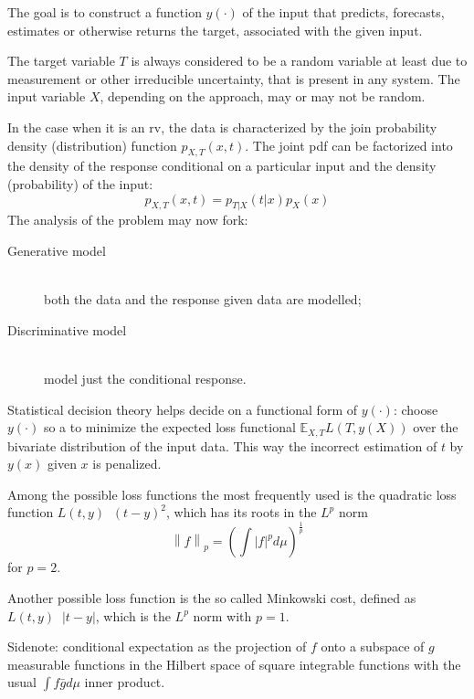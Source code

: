 \documentclass[a4paper]{article}
\newcommand{\brac}[1]{{\left ( #1 \right )}}
\newcommand{\induc}[1]{{\left . #1 \right \vert}}
\newcommand{\abs}[1]{{\left | #1 \right |}}
\newcommand{\nrm}[1]{{\left\| #1 \right \|}}
\newcommand{\Ex}[0]{{\mathbb{E}}}
\newcommand{\defn}{\mathop{\overset{\Delta}{=}}\nolimits}
\begin{document}
The goal is to construct a function $y(\cdot)$ of the input that predicts, forecasts, estimates or otherwise returns the target, associated with the given input.

The target variable $T$ is always considered to be a random variable at least due to measurement or other irreducible uncertainty, that is present in any system.
The input variable $X$, depending on the approach, may or may not be random.

In the case when it is an rv, the data is characterized by the join probability density (distribution) function $p_{X,T}\brac{x,t}$.
The joint pdf can be factorized into the density of the response conditional on a particular input and the density (probability) of the input:\[p_{X,T}\brac{x,t} = p_{\induc{T}X}\brac{\induc{t}x} p_X(x) \]
The analysis of the problem may now fork:
\begin{description}
	\item[Generative model] \hfill \\
		both the data and the response given data are modelled;
	\item[Discriminative model] \hfill \\
		model just the conditional response.
\end{description}

Statistical decision theory helps decide on a functional form of $y(\cdot)$:
choose $y(\cdot)$ so a to minimize the expected loss functional $\Ex_{X,T} L\brac{T,y(X)}$
over the bivariate distribution of the input data.
This way the incorrect estimation of $t$ by $y(x)$ given $x$ is penalized.

Among the possible loss functions the most frequently used is the quadratic
loss function $L(t,y) \defn \brac{t-y}^2$, which has its roots in the $L^p$ norm
\[\nrm{f}_p = \brac{\int \abs{f}^p d\mu}^\frac{1}{p}\] for $p = 2$.

Another possible loss function is the so called Minkowski cost, defined as $L(t,y) \defn \abs{t-y}$,
which is the $L^p$ norm with $p=1$.

Sidenote: conditional expectation as the projection of $f$ onto a subspace of $g$ measurable functions in the Hilbert space of square integrable functions with the usual $\int f\bar{g} d\mu$ inner product.

\end{document}
